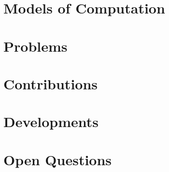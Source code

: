 \chapter{Models of Computation}


\chapter{Problems}


\chapter{Contributions}


\chapter{Developments}


\chapter{Open Questions}

